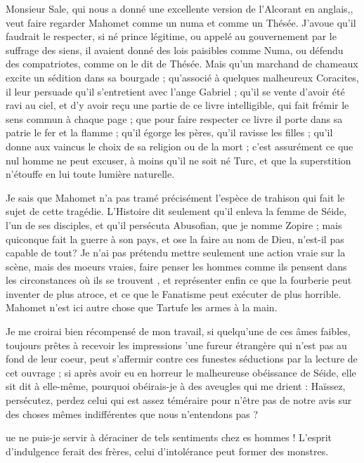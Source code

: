 \documentclass[french,twoside]{book} %
\begin{document}
Monsieur Sale, qui nous a donné une excellente version de l’Alcorant en anglais,, veut faire regarder Mahomet comme un numa et comme un Thésée. J’avoue qu’il faudrait le respecter, si né prince légitime, ou appelé au gouvernement par le suffrage des siens, il avaient donné des lois paisibles comme Numa, ou défendu des compatriotes, comme on le dit de Thésée. Mais qu’un marchand de chameaux excite un sédition dans sa bourgade ; qu’associé à quelques malheureux Coracites, il leur persuade qu’il s’entretient avec l’ange Gabriel ; qu’il se vente d’avoir été ravi au ciel, et d’y avoir reçu une partie de ce livre intelligible, qui fait frémir le sens commun à chaque page ; que pour faire respecter ce livre il porte dans sa patrie le fer et la flamme ; qu’il égorge les pères, qu’il ravisse les filles ; qu’il donne aux vaincus le choix de sa religion ou de la mort ; c’est assurément ce que nul homme ne peut excuser, à moins qu’il ne soit né Turc, et que la superstition n’étouffe en lui toute lumière naturelle.\par
Je sais que Mahomet n’a pas tramé précisément l’espèce de trahison qui fait le sujet de cette tragédie. L’Histoire dit seulement qu’il enleva la femme de Séide, l’un de ses disciples, et qu’il persécuta Abusofian, que je nomme Zopire ; mais quiconque fait la guerre à son pays, et ose la faire au nom de Dieu, n’est-il pas capable de tout? Je n’ai pas prétendu mettre seulement une action vraie sur la scène, mais des moeurs vraies, faire penser les hommes comme ils pensent dans les circonstances où ils se trouvent , et représenter enfin ce que la fourberie peut inventer de plus atroce, et ce que le Fanatisme peut exécuter de plus horrible. Mahomet n’est ici autre chose que Tartufe les armes à la main.\par
Je me croirai bien récompensé de mon travail, si quelqu’une de ces âmes faibles, toujours prêtes à recevoir les impressions ’une fureur étrangère qui n’est pas au fond de leur coeur, peut s’affermir contre ces funestes séductions par la lecture de cet ouvrage ; si après avoir eu en horreur le malheureuse obéissance de Séide, elle sit dit à elle-même, pourquoi obéirais-je à des aveugles qui me drient : Haïssez, persécutez, perdez celui qui est assez téméraire pour n’être pas de notre avis sur des choses mêmes indifférentes que nous n’entendons pas ?\par
ue ne puis-je servir à déraciner de tels sentiments chez es hommes ! L’esprit d’indulgence ferait des frères, celui d’intolérance peut former des monstres.\par
\end{document}
